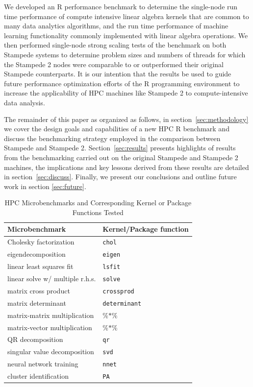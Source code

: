 We developed an R performance benchmark to determine the single-node run time performance
of compute intensive linear algebra kernels that are common to many data analytics
algorithms, and the run time performance of machine learning functionality commonly
implemented with linear algebra operations.  We then performed single-node strong scaling
tests of the benchmark on both Stampede systems to determine problem sizes and numbers of
threads for which the Stampede 2 nodes were comparable to or outperformed their original
Stampede counterparts.  It is our intention that the results be used to guide future
performance optimization efforts of the R programming environment to increase the
applicability of HPC machines like Stampede 2 to compute-intensive data
analysis.

The remainder of this paper as organized as follows, in section~\ref{sec:methodology} we
cover the design goals and capabilities of a new HPC R benchmark and discuss the
benchmarking strategy employed in the comparison between Stampede and Stampede 2.
Section~\ref{sec:results} presents highlights of results from the benchmarking carried out
on the original Stampede and Stampede 2 machines, the implications and key lessons derived
from these results are detailed in section~\ref{sec:discuss}. Finally, we present our
conclusions and outline future work in section \ref{sec:future}.

\begin{table}
  \caption{HPC Microbenchmarks and Corresponding Kernel or Package Functions Tested}
  \label{tab:microbenchmarks}
  \begin{tabular}{ll}
    \toprule
    Microbenchmark & Kernel/Package function \\
    \midrule
    Cholesky factorization       & \texttt{chol} \\
    eigendecomposition           & \texttt{eigen} \\
    linear least squares fit     & \texttt{lsfit} \\
    linear solve w/ multiple r.h.s. & \texttt{solve} \\
    matrix cross product         & \texttt{crossprod} \\
    matrix determinant           & \texttt{determinant} \\
    matrix-matrix multiplication & $\%$$*$$\%$ \\
    matrix-vector multiplication & $\%$$*$$\%$ \\
    QR decomposition             & \texttt{qr} \\
    singular value decomposition & \texttt{svd} \\
    neural network training      & \texttt{nnet} \\
    cluster identification       & \texttt{PA} \\
    \bottomrule
  \end{tabular}
\end{table}

